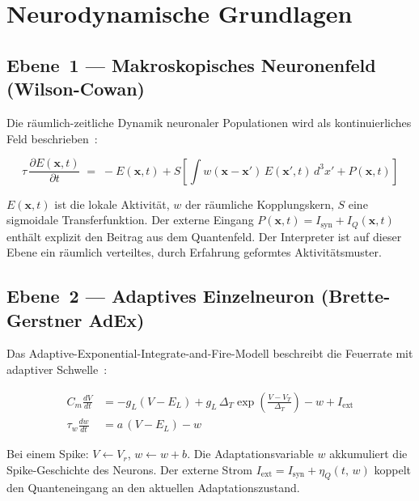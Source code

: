 \documentclass[11pt,a4paper]{article}
\begin{document}
\appendix
\section{Neurodynamische Grundlagen}
\label{app:neurodynamik}

\subsection*{Ebene~1 — Makroskopisches Neuronenfeld (Wilson-Cowan)}

Die räumlich-zeitliche Dynamik neuronaler Populationen wird als kontinuierliches
Feld beschrieben~\citep{wilsoncowan1972}:

\begin{equation}
  \tau \,\frac{\partial E(\mathbf{x},t)}{\partial t}
  \;=\; -E(\mathbf{x},t)
    + S\!\left[\int w(\mathbf{x}-\mathbf{x}')\,E(\mathbf{x}',t)\,d^3x'
               + P(\mathbf{x},t)\right]
  \label{eq:wilsoncowan}
\end{equation}

$E(\mathbf{x},t)$ ist die lokale Aktivität, $w$ der räumliche Kopplungskern,
$S$ eine sigmoidale Transferfunktion. Der externe Eingang
$P(\mathbf{x},t) = I_{\mathrm{syn}} + I_Q(\mathbf{x},t)$ enthält explizit den
Beitrag aus dem Quantenfeld. Der Interpreter ist auf dieser Ebene ein räumlich
verteiltes, durch Erfahrung geformtes Aktivitätsmuster.

\subsection*{Ebene~2 — Adaptives Einzelneuron (Brette-Gerstner AdEx)}

Das Adaptive-Exponential-Integrate-and-Fire-Modell beschreibt die Feuerrate
mit adaptiver Schwelle~\citep{brettegerstner2005}:

\begin{align}
  C_m \frac{dV}{dt} &= -g_L(V-E_L)
    + g_L\,\Delta_T\exp\!\left(\frac{V-V_T}{\Delta_T}\right)
    - w + I_{\mathrm{ext}}
  \label{eq:adex_V} \\
  \tau_w \frac{dw}{dt} &= a\,(V - E_L) - w
  \label{eq:adex_w}
\end{align}

Bei einem Spike: $V \leftarrow V_r$, $w \leftarrow w + b$.
Die Adaptationsvariable $w$ akkumuliert die Spike-Geschichte des Neurons.
Der externe Strom $I_{\mathrm{ext}} = I_{\mathrm{syn}} + \eta_Q(t,\,w)$
koppelt den Quanteneingang an den aktuellen Adaptationszustand.
\end{document}
